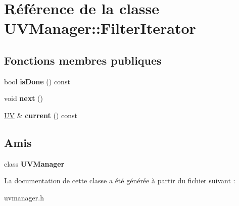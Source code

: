\hypertarget{class_u_v_manager_1_1_filter_iterator}{\section{Référence de la classe U\+V\+Manager\+:\+:Filter\+Iterator}
\label{class_u_v_manager_1_1_filter_iterator}
}
\subsection*{Fonctions membres publiques}
\begin{DoxyCompactItemize}
\item 
\hypertarget{class_u_v_manager_1_1_filter_iterator_a30e4c79f7734cd2b526aed31c437fe47}{bool {\bfseries is\+Done} () const }\label{class_u_v_manager_1_1_filter_iterator_a30e4c79f7734cd2b526aed31c437fe47}

\item 
\hypertarget{class_u_v_manager_1_1_filter_iterator_a60c822de494b70f0837a8c3e241dd3e6}{void {\bfseries next} ()}\label{class_u_v_manager_1_1_filter_iterator_a60c822de494b70f0837a8c3e241dd3e6}

\item 
\hypertarget{class_u_v_manager_1_1_filter_iterator_a1b8f963bba647ce40061ee672e94d6e2}{\hyperlink{class_u_v}{U\+V} \& {\bfseries current} () const }\label{class_u_v_manager_1_1_filter_iterator_a1b8f963bba647ce40061ee672e94d6e2}

\end{DoxyCompactItemize}
\subsection*{Amis}
\begin{DoxyCompactItemize}
\item 
\hypertarget{class_u_v_manager_1_1_filter_iterator_a335ec2026467669b89518b0c67372f3b}{class {\bfseries U\+V\+Manager}}\label{class_u_v_manager_1_1_filter_iterator_a335ec2026467669b89518b0c67372f3b}

\end{DoxyCompactItemize}


La documentation de cette classe a été générée à partir du fichier suivant \+:\begin{DoxyCompactItemize}
\item 
uvmanager.\+h\end{DoxyCompactItemize}
